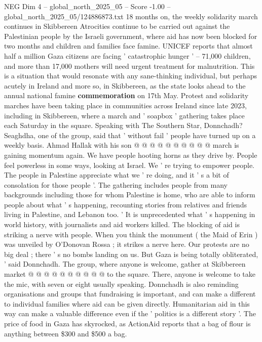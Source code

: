 \begin{textsample}{NEG Dim 4 – global\_north\_2025\_05 – Score -1.00 – global\_north\_2025\_05/124886873.txt}  \label{ex:f4_neg_242}
18 months on, the weekly solidarity march continues in Skibbereen Atrocities continue to be carried out against the Palestinian people by the Israeli government, where aid has now been blocked for two months and children and families face famine.
UNICEF reports that almost half a million Gaza citizens are facing ' catastrophic hunger ' -- 71,000 children, and more than 17,000 mothers will need urgent treatment for malnutrition.
This is a situation that would resonate with any sane-thinking individual, but perhaps acutely in Ireland and more so, in Skibbereen, as the state looks ahead to the annual national famine \textbf{commemoration} on 17th May.
Protest and solidarity marches have been taking place in communities across Ireland since late 2023, including in Skibbereen, where a march and ' soapbox ' gathering takes place each Saturday in the square.
Speaking with The Southern Star, Donnchadh?
Seaghdha, one of the group, said that ' without fail ' people have turned up on a weekly basis.
Ahmad Hallak with his son @ @ @ @ @ @ @ @ @ @ march is gaining momentum again.
We have people hooting horns as they drive by.
People feel powerless in some ways, looking at Israel.
We ' re trying to empower people.
The people in Palestine appreciate what we ' re doing, and it ' s a bit of consolation for those people '.
The gathering includes people from many backgrounds including those for whom Palestine is home, who are able to inform people about what ' s happening, recounting stories from relatives and friends living in Palestine, and Lebanon too. ' It is unprecedented what ' s happening in world history, with journalists and aid workers killed.
The blocking of aid is striking a nerve with people.
When you think the monument ( the Maid of Erin ) was unveiled by O'Donovan Rossa ; it strikes a nerve here.
Our protests are no big deal ; there ' s no bombs landing on us.
But Gaza is being totally obliterated, ' said Donnchadh.
The group, where anyone is welcome, gather at Skibbereen market @ @ @ @ @ @ @ @ @ @ to the square.
There, anyone is welcome to take the mic, with seven or eight usually speaking.
Donnchadh is also reminding organisations and groups that fundraising is important, and can make a different to individual families where aid can be given directly.
Humanitarian aid in this way can make a valuable difference even if the ' politics is a different story '.
The price of food in Gaza has skyrocked, as ActionAid reports that a bag of flour is anything between \$300 and \$500 a bag.

\end{textsample}

